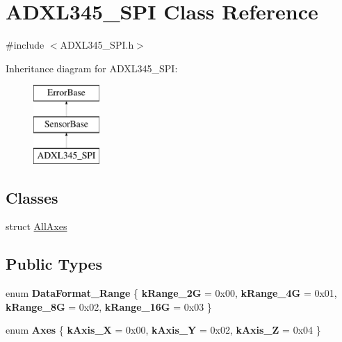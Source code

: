 \hypertarget{classADXL345__SPI}{
\section{ADXL345\_\-SPI Class Reference}
\label{classADXL345__SPI}
}


{\ttfamily \#include $<$ADXL345\_\-SPI.h$>$}

Inheritance diagram for ADXL345\_\-SPI:\begin{figure}[H]
\begin{center}
\leavevmode
\includegraphics[height=3.000000cm]{classADXL345__SPI}
\end{center}
\end{figure}
\subsection*{Classes}
\begin{DoxyCompactItemize}
\item 
struct \hyperlink{structADXL345__SPI_1_1AllAxes}{AllAxes}
\end{DoxyCompactItemize}
\subsection*{Public Types}
\begin{DoxyCompactItemize}
\item 
enum {\bfseries DataFormat\_\-Range} \{ {\bfseries kRange\_\-2G} = 0x00, 
{\bfseries kRange\_\-4G} = 0x01, 
{\bfseries kRange\_\-8G} = 0x02, 
{\bfseries kRange\_\-16G} = 0x03
 \}
\item 
enum {\bfseries Axes} \{ {\bfseries kAxis\_\-X} = 0x00, 
{\bfseries kAxis\_\-Y} = 0x02, 
{\bfseries kAxis\_\-Z} = 0x04
 \}
\end{DoxyCompactItemize}
